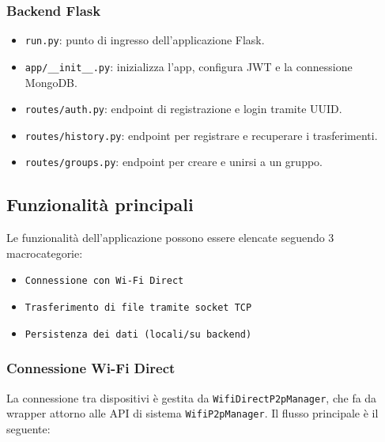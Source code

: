 \subsubsection*{Backend Flask}


\begin{itemize}[label={--}, leftmargin=1.2cm]
    \item \texttt{run.py}: punto di ingresso dell'applicazione Flask.
    \item \texttt{app/\_\_init\_\_.py}: inizializza l'app, configura JWT e la connessione MongoDB.
    \item \texttt{routes/auth.py}: endpoint di registrazione e login tramite UUID.
    \item \texttt{routes/history.py}: endpoint per registrare e recuperare i trasferimenti.
    \item \texttt{routes/groups.py}: endpoint per creare e unirsi a un gruppo.
\end{itemize}

\subsection{Funzionalità principali}

Le funzionalità dell'applicazione possono essere elencate seguendo 3 macrocategorie:
\begin{itemize}[label={--}, leftmargin=1.2cm]
    \item \texttt{Connessione con Wi-Fi Direct}
    \item  \texttt{Trasferimento di file tramite socket TCP}
    \item \texttt{Persistenza dei dati (locali/su backend)}
\end{itemize}

\subsubsection*{Connessione Wi-Fi Direct}

La connessione tra dispositivi è gestita da \texttt{WifiDirectP2pManager}, che fa da wrapper attorno alle API di sistema \texttt{WifiP2pManager}. Il flusso principale è il seguente:

